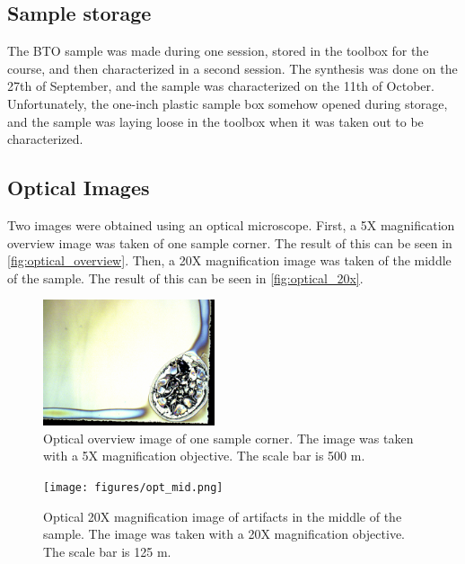 \subsection{Sample storage}
\label{sec:sample-storage}
\noindent The BTO sample was made during one session, stored in the toolbox for the course, and then characterized in a second session.
The synthesis was done on the 27th of September, and the sample was characterized on the 11th of October.
Unfortunately, the one-inch plastic sample box somehow opened during storage, and the sample was laying loose in the toolbox when it was taken out to be characterized.




\subsection{Optical Images}

\noindent Two images were obtained using an optical microscope.
First, a 5X magnification overview image was taken of one sample corner.
The result of this can be seen in \autoref{fig:optical_overview}.
Then, a 20X magnification image was taken of the middle of the sample.
The result of this can be seen in \autoref{fig:optical_20x}.

\begin{figure}[ht]
    \centering
    \includegraphics[width=0.45\textwidth]{figures/opt_corner.png}
    \caption{
        Optical overview image of one sample corner.
        The image was taken with a 5X magnification objective.
        The scale bar is 500 \textmu m.
    }
    \label{fig:optical_overview}
\end{figure}

\begin{figure}[ht]
    \centering
    \texttt{[image: figures/opt\_mid.png]}
    \caption{
        Optical 20X magnification image of artifacts in the middle of the sample.
        The image was taken with a 20X magnification objective.
        The scale bar is 125 \textmu m.
    }
    \label{fig:optical_20x}
\end{figure}


